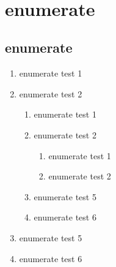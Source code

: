 \documentclass[12pt, a4paper, oneside]{book}
\let\stdsection\section
\renewcommand\section{\newpage\stdsection}
\begin{document}
		\setlength{\fboxsep}{12pt}
		\begin{boxedminipage}[c]{1.0\linewidth}
		\end{boxedminipage}\\



	\chapter{enumerate}


	\section{enumerate}

			\begin{enumerate}
			\setlength\itemsep{-1.0em}
			\item	enumerate test 1
			\item	enumerate test 2
				\begin{enumerate}
				\setlength\itemsep{-1.0em}
				\item	enumerate test 1
				\item	enumerate test 2
					\begin{enumerate}
					\setlength\itemsep{-1.0em}
					\item	enumerate test 1
					\item	enumerate test 2
					\end{enumerate}
				\item	enumerate test 5
				\item	enumerate test 6
				\end{enumerate}
			\item	enumerate test 5
			\item	enumerate test 6
			\end{enumerate}
		
\end{document}
